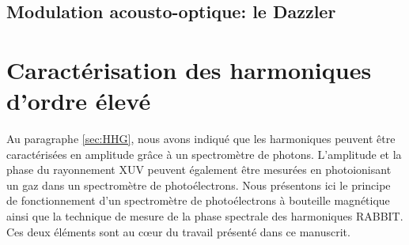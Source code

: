 \subsection{Modulation acousto-optique: le Dazzler}


\section{Caractérisation des harmoniques d'ordre élevé}
\label{sec:CaracHHG}
Au paragraphe \ref{sec:HHG}, nous avons indiqué que les harmoniques peuvent être caractérisées en amplitude grâce à un spectromètre de photons. L'amplitude et la phase du rayonnement XUV peuvent également être mesurées en photoionisant un gaz dans un spectromètre de photoélectrons. Nous présentons ici le principe de fonctionnement d'un spectromètre de photoélectrons à bouteille magnétique ainsi que la technique de mesure de la phase spectrale des harmoniques RABBIT. Ces deux éléments sont au c\oe ur du travail présenté dans ce manuscrit.
